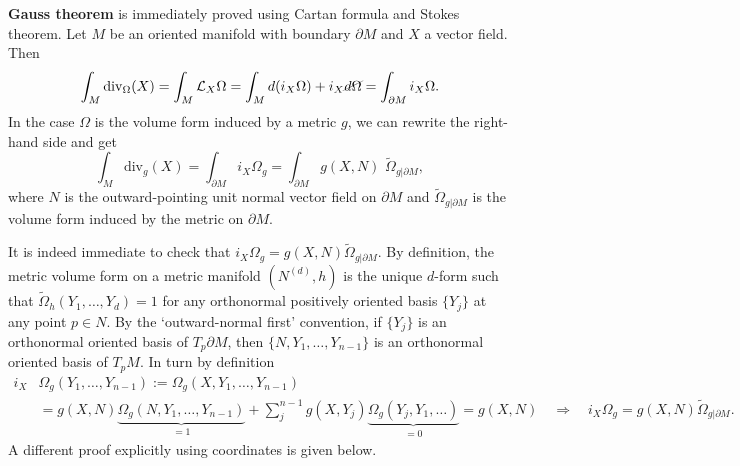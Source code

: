 \documentclass[../geometry_main.tex]{subfiles}
\begin{document}
\begin{mytheorem}
\textbf{Gauss theorem} is immediately proved using Cartan formula and Stokes theorem.
Let $M$ be an oriented manifold with boundary $\partial M$ and $X$ a vector field.
Then
\begin{equation}
    \int_M \mathrm{div}_\Omega (X) = \int_M \mathcal{L}_X \Omega = \int_M d (i_X \Omega) + i_X \graycancel{d\Omega} = \int_{\partial M} i_X \Omega.
\end{equation}
In the case $\Omega$ is the volume form induced by a metric $g$, we can rewrite the right-hand side and get
\begin{equation}
    \int_M \mathrm{div}_g (X) = \int_{\partial M} i_X \Omega_g = \int_{\partial M} g(X, N)\,\, \tilde{\Omega}_{g|\partial M},
\end{equation}
where $N$ is the outward-pointing unit normal vector field on $\partial M$ and $\tilde{\Omega}_{g|\partial M}$ is the volume form induced by the metric on $\partial M$.

It is indeed immediate to check that $i_X \Omega_g = g(X,N) \tilde{\Omega}_{g|\partial M}$.
By definition, the metric volume form on a metric manifold $(N^{(d)},h)$ is the unique $d$-form such that $\tilde{\Omega}_h (Y_1, \dots, Y_d) = 1$ for any orthonormal positively oriented basis $\{Y_j\}$ at any point $p\in N$.
By the `outward-normal first' convention, if $\{Y_j\}$ is an orthonormal oriented basis of $T_p \partial M$, then $\{N, Y_1, \dots, Y_{n-1}\}$ is an orthonormal oriented basis of $T_p M$.
In turn by definition
{\small
\begin{align}
    i_X&\Omega_g(Y_1, \dots, Y_{n-1}):= \Omega_g (X, Y_1, \dots, Y_{n-1})\\
    &= g(X,N) \underbrace{\Omega_g (N, Y_1, \dots, Y_{n-1})}_{=1} + \sum_j^{n-1} g(X,Y_j) \underbrace{\Omega_g(Y_j, Y_1, \dots)}_{=0} = g(X,N)
    \quad \Rightarrow \quad i_X \Omega_g = g(X,N) \tilde{\Omega}_{g|\partial M}. 
\end{align}
}
A different proof explicitly using coordinates is given below.


\end{mytheorem}
\end{document}
